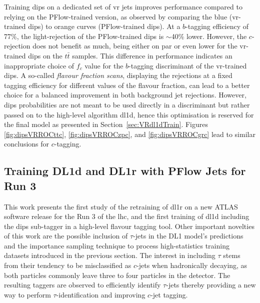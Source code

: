 Training \gls{dips} on a dedicated set of \gls{vr} jets improves performance compared to relying on the PFlow-trained version, as observed by comparing the blue (\gls{vr}-trained \gls{dips}) to orange curves (PFlow-trained \gls{dips}). At a $b$-tagging efficiency of 77\%, the light-rejection of the PFlow-trained \gls{dips} is $\sim$40\% lower. However, the $c$-rejection does not benefit as much, being either on par or even lower for the \gls{vr}-trained \gls{dips} on the $t\bar{t}$ samples. This difference in performance indicates an inappropriate choice of $f_c$ value for the $b$-tagging discriminant of the \gls{vr}-trained \gls{dips}. A so-called \textit{flavour fraction scans}, displaying the rejections at a fixed tagging efficiency for different values of the flavour fraction, can lead to a better choice for a balanced improvement in both background jet rejections. However, \gls{dips} probabilities are not meant to be used directly in a discriminant but rather passed on to the high-level algorithm \gls{dl1d}, hence this optimisation is reserved for the final model as presented in Section~\ref{sec:VRdl1dTrain}. Figures \ref{fig:dipsVRROCttc}, \ref{fig:dipsVRROCzpc}, and \ref{fig:dipsVRROCgrc} lead to similar conclusions for $c$-tagging.

\subsection{Training DL1d and DL1r with PFlow Jets for Run 3}
This work presents the first study of the retraining of \gls{dl1r} on a new ATLAS software release for the Run 3 of the \gls{lhc}, and the first training of \gls{dl1d} including the \gls{dips} sub-tagger in a high-level flavour tagging tool. Other important novelties of this work are the possible inclusion of $\tau$-jets in the DL1 model's predictions and the importance sampling technique to process high-statistics training datasets introduced in the previous section. The interest in including $\tau$ stems from their tendency to be misclassified as $c$-jets when hadronically decaying, as both particles commonly leave three to four particles in the detector. The resulting taggers are observed to efficiently identify $\tau$-jets thereby providing a new way to perform $\tau$-identification and improving $c$-jet tagging.\\ %

